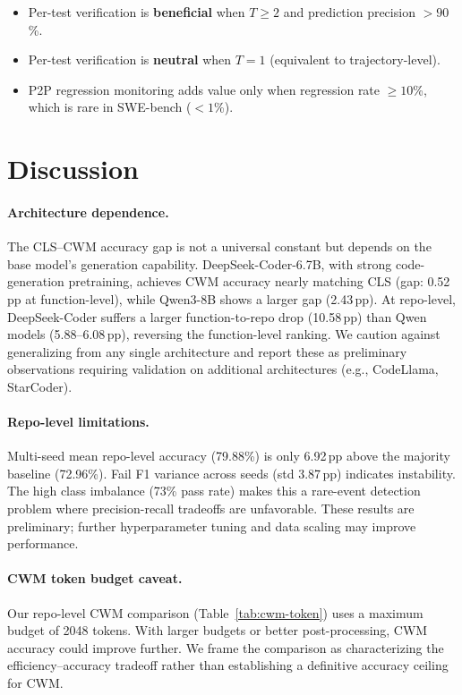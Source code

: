 \documentclass[11pt,a4paper]{article}
\begin{document}
\begin{itemize}
\item Per-test verification is \textbf{beneficial} when $T\!\ge\!2$ and prediction precision $>\!90$\%.
\item Per-test verification is \textbf{neutral} when $T\!=\!1$ (equivalent to trajectory-level).
\item P2P regression monitoring adds value only when regression rate $\ge\!10$\%, which is rare in SWE-bench ($<\!1$\%).
\end{itemize}

\section{Discussion}

\paragraph{Architecture dependence.}
The CLS--CWM accuracy gap is not a universal constant but depends on the base model's generation capability.
DeepSeek-Coder-6.7B, with strong code-generation pretraining, achieves CWM accuracy nearly matching CLS (gap: 0.52\,pp at function-level), while Qwen3-8B shows a larger gap (2.43\,pp).
At repo-level, DeepSeek-Coder suffers a larger function-to-repo drop (10.58\,pp) than Qwen models (5.88--6.08\,pp), reversing the function-level ranking.
We caution against generalizing from any single architecture and report these as preliminary observations requiring validation on additional architectures (e.g., CodeLlama, StarCoder).

\paragraph{Repo-level limitations.}
Multi-seed mean repo-level accuracy (79.88\%) is only 6.92\,pp above the majority baseline (72.96\%).
Fail F1 variance across seeds (std 3.87\,pp) indicates instability.
The high class imbalance (73\% pass rate) makes this a rare-event detection problem where precision-recall tradeoffs are unfavorable.
These results are preliminary; further hyperparameter tuning and data scaling may improve performance.

\paragraph{CWM token budget caveat.}
Our repo-level CWM comparison (Table~\ref{tab:cwm-token}) uses a maximum budget of 2048 tokens.
With larger budgets or better post-processing, CWM accuracy could improve further.
We frame the comparison as characterizing the efficiency--accuracy tradeoff rather than establishing a definitive accuracy ceiling for CWM.
\end{document}
